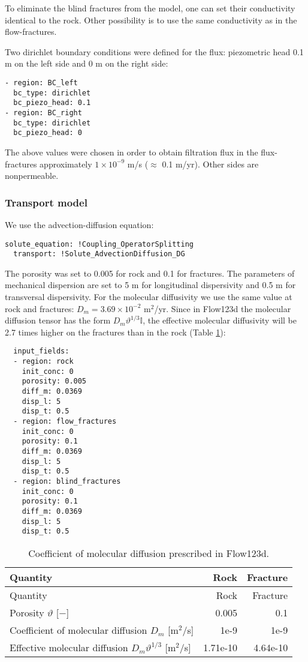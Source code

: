 To eliminate the blind fractures from the model, one can set their
conductivity identical to the rock. Other possibility is to use the same
conductivity as in the flow-fractures.

Two dirichlet boundary conditions were defined for the flux: piezometric
head 0.1 m on the left side and 0 m on the right side:

\begin{verbatim}
- region: BC_left
  bc_type: dirichlet
  bc_piezo_head: 0.1
- region: BC_right
  bc_type: dirichlet
  bc_piezo_head: 0
\end{verbatim}

The above values were chosen in order to obtain filtration flux in the
flux-fractures approximately \(1 \times 10^{-9}\) m/s (\(\approx\) 0.1
m/yr). Other sides are nonpermeable.

\subsubsection{Transport model}\label{transport-model}

We use the advection-diffusion equation:

\begin{verbatim}
solute_equation: !Coupling_OperatorSplitting
  transport: !Solute_AdvectionDiffusion_DG
\end{verbatim}

The porosity was set to 0.005 for rock and 0.1 for fractures. The
parameters of mechanical dispersion are set to 5 m for longitudinal
dispersivity and 0.5 m for transversal dispersivity. For the molecular
diffusivity we use the same value at rock and fractures:
\(D_m = 3.69 \times 10^{-2}\) m\(^2\)/yr. Since in Flow123d the
molecular diffusion tensor has the form \(D_m\vartheta^{1/3}\mathbb I\),
the effective molecular diffusivity will be 2.7 times higher on the
fractures than in the rock (Table \ref{tbl:coefDiff}):

\begin{verbatim}
  input_fields:
  - region: rock
    init_conc: 0
    porosity: 0.005
    diff_m: 0.0369
    disp_l: 5
    disp_t: 0.5
  - region: flow_fractures
    init_conc: 0
    porosity: 0.1
    diff_m: 0.0369
    disp_l: 5
    disp_t: 0.5
  - region: blind_fractures
    init_conc: 0
    porosity: 0.1
    diff_m: 0.0369
    disp_l: 5
    disp_t: 0.5
\end{verbatim}

\begin{longtable}[c]{@{}lrr@{}}
\caption{Coefficient of molecular diffusion prescribed in Flow123d.
\label{tbl:coefDiff}}\tabularnewline
\toprule
Quantity & Rock & Fracture\tabularnewline
\midrule
\endfirsthead
\toprule
Quantity & Rock & Fracture\tabularnewline
\midrule
\endhead
Porosity \(\vartheta\) {[}\(-\){]} & 0.005 & 0.1\tabularnewline
Coefficient of molecular diffusion \(D_m\) {[}m\(^2\)/s{]} & 1e-9 &
1e-9\tabularnewline
Effective molecular diffusion \(D_m\vartheta^{1/3}\) {[}m\(^2\)/s{]} &
1.71e-10 & 4.64e-10\tabularnewline
\bottomrule
\end{longtable}

